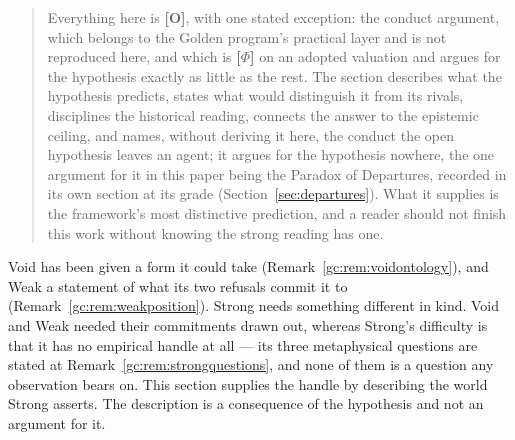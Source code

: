 \begin{quote}
Everything here is \textbf{[O]}, with one stated exception: the
conduct argument, which belongs to the Golden program's practical layer
and is not reproduced here, and which is
\textbf{[$\Phi$]} on an adopted valuation and argues for the
hypothesis exactly as little as the rest. The section describes what
the hypothesis predicts, states what would distinguish it from its
rivals, disciplines the historical reading, connects the answer to the
epistemic ceiling, and names, without deriving it here, the conduct the
open hypothesis leaves an agent; it argues for the hypothesis nowhere, the one argument for it in this
paper being the Paradox of Departures, recorded in its own
section at its grade (Section~\ref{sec:departures}). What it supplies is the framework's most distinctive
prediction, and a reader should not finish this work without knowing the
strong reading has one.
\end{quote}

Void has been given a form it could take
(Remark~\ref{gc:rem:voidontology}), and Weak a statement of what its two
refusals commit it to (Remark~\ref{gc:rem:weakposition}). Strong needs
something different in kind. Void and Weak needed their commitments
drawn out, whereas Strong's difficulty is that it has no empirical handle
at all --- its three metaphysical questions are stated at
Remark~\ref{gc:rem:strongquestions}, and none of them is a question any
observation bears on. This section supplies the handle by describing the
world Strong asserts. The description is a consequence of the hypothesis
and not an argument for it.


